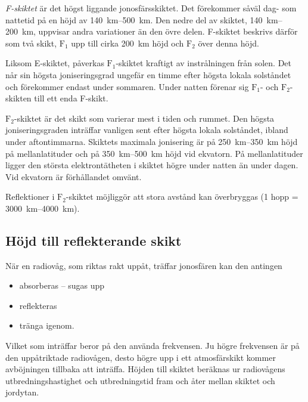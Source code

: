 \emph{F-skiktet} är det högst liggande jonosfärsskiktet.
Det förekommer såväl dag- som nattetid på en höjd av
\SIrange{140}{500}{\kilo\metre}.
Den nedre del av skiktet, \SIrange{140}{200}{\kilo\metre}, uppvisar andra
variationer än den övre delen.
F-skiktet beskrivs därför som två skikt, \(\mathrm{F_1}\) upp till cirka
\SI{200}{\kilo\metre} höjd och \(\mathrm{F_2}\) över denna höjd.

Liksom E-skiktet, påverkas \(\mathrm{F_1}\)-skiktet kraftigt av
instrålningen från solen.
Det når sin högsta joniseringsgrad ungefär en timme efter högsta lokala
solståndet och förekommer endast under sommaren.
Under natten förenar sig \(\mathrm{F_1}\)- och \(\mathrm{F_2}\)-skikten till
ett enda F-skikt.

\(\mathrm{F_2}\)-skiktet är det skikt som varierar mest i tiden och rummet.
Den högsta joniseringsgraden inträffar vanligen sent efter högsta lokala
solståndet, ibland under aftontimmarna.
Skiktets maximala jonisering är på \SIrange{250}{350}{\kilo\metre} höjd på
mellanlatituder och på \SIrange{350}{500}{\kilo\metre} höjd vid ekvatorn.
På mellanlatituder ligger den största elektrontätheten i skiktet högre under
natten än under dagen.
Vid ekvatorn är förhållandet omvänt.

Reflektioner i \(\mathrm{F_2}\)-skiktet möjliggör att stora
avstånd kan överbryggas (1 hopp = \SIrange{3000}{4000}{\kilo\metre}).


\subsection{Höjd till reflekterande skikt}

När en radiovåg, som riktas rakt uppåt, träffar jonosfären kan den antingen
\begin{itemize}
  \item absorberas -- sugas upp
  \item reflekteras
  \item tränga igenom.
\end{itemize}

Vilket som inträffar beror på den använda frekvensen.
Ju högre frekvensen är på den uppåtriktade radiovågen, desto högre upp i ett
atmosfärskikt kommer avböjningen tillbaka att inträffa.
Höjden till skiktet beräknas ur radiovågens utbredningshastighet och
utbredningstid fram och åter mellan skiktet och jordytan.

